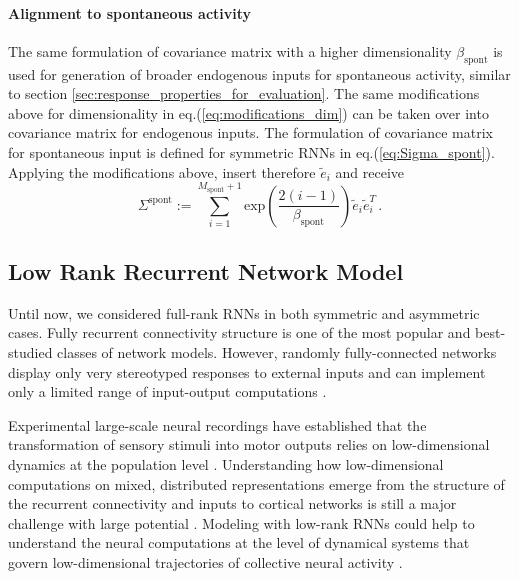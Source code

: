 \documentclass[11pt]{article}
\begin{document}
	\paragraph{Alignment to spontaneous activity} %
	The same formulation of covariance matrix with a higher dimensionality $\beta_{\text{spont}}$ is used for generation of broader endogenous inputs for spontaneous activity, similar to section \ref{sec:response_properties_for_evaluation}. The same modifications above for dimensionality in eq.(\ref{eq:modifications_dim}) can be taken over into covariance matrix for endogenous inputs. The formulation of covariance matrix for spontaneous input is defined for symmetric RNNs in eq.(\ref{eq:Sigma_spont}). Applying the modifications above, insert therefore $\tilde{e}_i$ and receive  
	  	\begin{equation} \label{eq:Sigma_spont_asym}
	  		\Sigma^{\text{spont}} := \sum_{i=1}^{M_{\text{spont}} + 1} 	\text{exp}\left(\frac{2(i-1)}{\beta_{\text{spont}}}\right) \tilde{e}_i \tilde{e}_i^T \, .
	  	\end{equation}
				  
	\clearpage
	\subsection{Low Rank Recurrent Network Model} \label{sec:low_rank_method}
	Until now, we considered full-rank RNNs in both symmetric and asymmetric cases. Fully recurrent connectivity structure is one of the most popular and best-studied classes of network models. However, randomly fully-connected networks display only very stereotyped responses to external inputs and can implement only a limited range of input-output computations \cite{mastrogiuseppe2018linking}. 
	
	Experimental large-scale neural recordings have established that the transformation of sensory stimuli into motor outputs relies on low-dimensional dynamics at the population level \cite{mastrogiuseppe2018linking}. 
	Understanding how low-dimensional computations on mixed, distributed representations emerge from the structure of the recurrent connectivity and inputs to cortical networks is still a major challenge with large potential \cite{mastrogiuseppe2018linking}. Modeling with low-rank RNNs could help to understand the neural computations at the level of dynamical systems that govern low-dimensional trajectories of collective neural activity \cite{beiran2021shaping}. 
	
\end{document}
